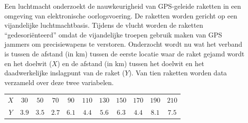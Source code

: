 \begin{question}{30}{
    Een luchtmacht onderzoekt de nauwkeurigheid van GPS-geleide raketten in een omgeving van elektronische oorlogsvoering.
    De raketten worden gericht op een vijandelijke luchtmachtbasis.
    Tijdens de vlucht worden de raketten ``gedesori\"enteerd'' omdat de vijandelijke troepen gebruik maken van GPS jammers om precisiewapens te verstoren.
    Onderzocht wordt nu wat het verband is tussen de afstand (in km) tussen de eerste locatie waar de raket gejamd wordt en het doelwit ($X$) en de afstand (in km) tussen het doelwit en het daadwerkelijke inslagpunt van de raket ($Y$).
    Van tien raketten worden data verzameld over deze twee variabelen.
    \begin{center}
        \begin{tabular}{c|cccccccccc}
            \toprule
                \textbf{$X$} & $30$ & $50$ & $70$ & $90$ & $110$ & $130$ & $150$ & $170$ & $190$ & $210$ \\
                \textbf{$Y$} & $3.9$ & $3.5$ & $2.7$ & $6.1$ & $4.4$ & $5.6$ & $6.3$ & $4.4$ & $8.1$ & $7.5$ \\
            \bottomrule
        \end{tabular}
    \end{center}

}



\end{question}

